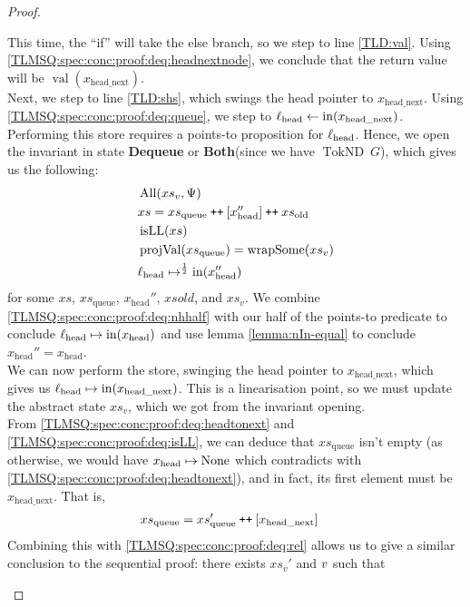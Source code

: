 \documentclass[a4paper, 10pt]{report}
\theoremstyle{definition}
\newcommand{\xsc}{xs}
\newcommand{\xsqueue}{xs_{\mathrm{queue}}}
\newcommand{\xsold}{xs_{\mathrm{old}}}
\newcommand{\isLL}{\operatorname{isLL}}
\newcommand{\AllP}{\operatorname{All}}
\newcommand{\projval}{\operatorname{projVal}}
\newcommand{\wrapsome}{\operatorname{wrapSome}}
\newcommand{\locN}[1]{\loc_{\mathrm{#1}}}
\newcommand{\lochead}{\locN{head}}
\newcommand{\nIn}[1]{\operatorname{in}(#1)}
\newcommand{\nVal}[1]{\operatorname{val}(#1)}
\newcommand{\node}{x}
\newcommand{\nodeN}[1]{\node_{\mathrm{#1}}}
\newcommand{\nodehead}{\nodeN{head}}
\newcommand{\nodeheadnext}{\nodeN{head\_next}}
\newcommand{\absvalue}{\val}
\newcommand{\absvalueList}{xs_v}
\newcommand{\DequeueState}{\textbf{Dequeue}\xspace}
\newcommand{\BothState}{\textbf{Both}\xspace}
\newcommand{\Qg}{G}
\newcommand{\TokND}[1]{\operatorname{TokND} ~ #1}
\newcommand{\TokNDQg}{\TokND{\Qg}}
\newcommand\catenate{\mathbin{\text{\ttfamily\upshape ++}}}
\begin{document}
\begin{proof}
\begin{itemize}
  This time, the ``if'' will take the else branch, so we step to line \ref{TLD:val}. Using \ref{TLMSQ:spec:conc:proof:deq:headnextnode}, we conclude that the return value will be $\nVal{\nodeheadnext}$.\\
  Next, we step to line \ref{TLD:shs}, which swings the head pointer to $\nodeheadnext$. Using \ref{TLMSQ:spec:conc:proof:deq:queue}, we step to $\lochead \gets \nIn{\nodeheadnext}$. Performing this store requires a points-to proposition for $\lochead$. Hence, we open the invariant in state \DequeueState or \BothState (since we have $\TokNDQg$), which gives us the following:
  \begin{align}
    &\AllP(\absvalueList, \Psi)\label{TLMSQ:spec:conc:proof:deq:allP}\\
    &\xsc = \xsqueue \catenate [\nodehead''] \catenate \xsold\label{TLMSQ:spec:conc:proof:deq:xsrel}\\
    &\isLL(\xsc)\label{TLMSQ:spec:conc:proof:deq:isLL}\\
    &\projval(\xsqueue) = \wrapsome(\absvalueList)\label{TLMSQ:spec:conc:proof:deq:rel}\\
    &\lochead \mapsto^{\frac{1}{2}} \nIn{\nodehead''}\label{TLMSQ:spec:conc:proof:deq:nhhalf}
  \end{align}
  for some $\xsc$, $\xsqueue$, $\nodehead''$,  $xsold$, and $\absvalueList$. We combine \ref{TLMSQ:spec:conc:proof:deq:nhhalf} with our half of the points-to predicate to conclude $\lochead \mapsto \nIn{\nodehead}$ and use lemma \ref{lemma:nIn-equal} to conclude $\nodehead'' = \nodehead$.\\
  We can now perform the store, swinging the head pointer to $\nodeheadnext$, which gives us $\lochead \mapsto \nIn{\nodeheadnext}$. This is a linearisation point, so we must update the abstract state $\absvalueList$, which we got from the invariant opening.\\
  From \ref{TLMSQ:spec:conc:proof:deq:headtonext} and \ref{TLMSQ:spec:conc:proof:deq:isLL}, we can deduce that $\xsqueue$ isn't empty (as otherwise, we would have $\nodehead \mapsto \None$ which contradicts with \ref{TLMSQ:spec:conc:proof:deq:headtonext}), and in fact, its first element must be $\nodeheadnext$. That is,
  \begin{align}
    &\xsqueue = \xsqueue' \catenate [\nodeheadnext]\label{TLMSQ:spec:conc:proof:deq:xsqueue}
  \end{align}
  Combining this with \ref{TLMSQ:spec:conc:proof:deq:rel} allows us to give a similar conclusion to the sequential proof: there exists $\absvalueList'$ and $\absvalue$ such that

\end{itemize}
\end{proof}
\end{document}

